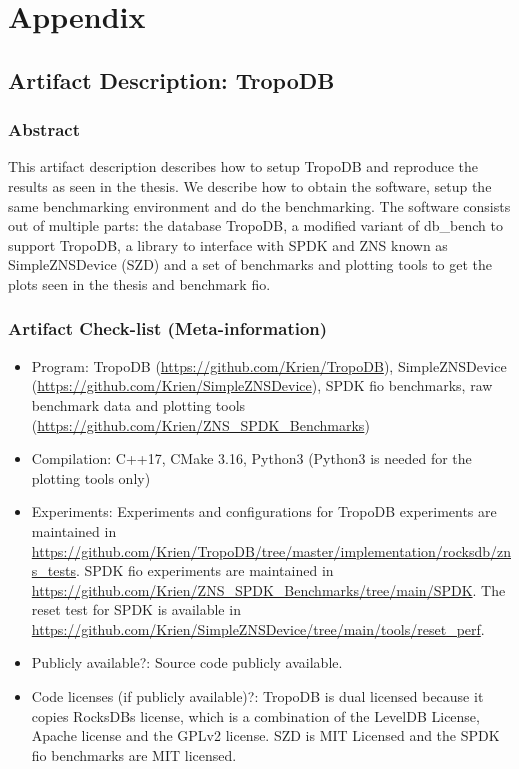 \chapter{Appendix}
\label{sec:appendix}
\section{Artifact Description: TropoDB}
\subsection{Abstract}
This artifact description describes how to setup TropoDB and reproduce the results as seen in the thesis.
We describe how to obtain the software, setup the same benchmarking environment and do the benchmarking. 
The software consists out of multiple parts: the database TropoDB, a modified variant of db\_bench to support TropoDB, a library to interface with SPDK and ZNS known as SimpleZNSDevice (SZD) 
and a set of benchmarks and plotting tools to get the plots seen in the thesis and benchmark fio.

\subsection{Artifact Check-list (Meta-information)}
\begin{itemize}
    \item Program: TropoDB (\url{https://github.com/Krien/TropoDB}), SimpleZNSDevice (\url{https://github.com/Krien/SimpleZNSDevice}), SPDK fio benchmarks, 
    raw benchmark data and plotting tools (\url{https://github.com/Krien/ZNS_SPDK_Benchmarks})
    \item Compilation: C++17, CMake 3.16, Python3 (Python3 is needed for the plotting tools only)
    \item Experiments: Experiments and configurations for TropoDB experiments are maintained in \url{https://github.com/Krien/TropoDB/tree/master/implementation/rocksdb/zns_tests}. 
    SPDK fio experiments are maintained in \url{https://github.com/Krien/ZNS_SPDK_Benchmarks/tree/main/SPDK}.
    The reset test for SPDK is available in \url{https://github.com/Krien/SimpleZNSDevice/tree/main/tools/reset_perf}.
    \item Publicly available?: Source code publicly available.
    \item Code licenses (if publicly available)?: TropoDB is dual licensed because it copies RocksDBs license, which is a combination of the LevelDB License, Apache license and the GPLv2 license.
     SZD is MIT Licensed and the SPDK fio benchmarks are MIT licensed.
\end{itemize}
  
